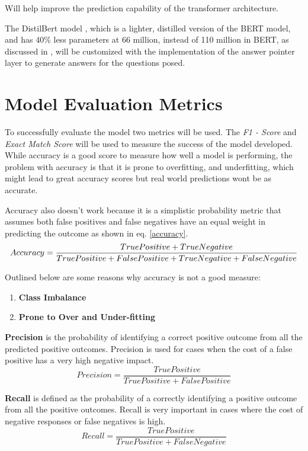 \documentclass[a4paper,12pt]{report}
\begin{document}
	Will help improve the prediction capability of the transformer architecture.

	The DistilBert model \citep{distil}, which is a lighter, distilled version of the BERT model, and has 40\% less parameters at 66 million, instead of 110 million in BERT, as discussed in \citep{bert}, will be customized with the implementation of the answer pointer layer to generate answers for the questions posed.


	\section{Model Evaluation Metrics}\label{33}

		To successfully evaluate the model two metrics will be used. The \textit{F1 - Score} and \textit{Exact Match Score} will be used to measure the success of the model developed. While accuracy is a good score to measure how well a model is performing, the problem with accuracy is that it is prone to overfitting, and underfitting, which might lead to great accuracy scores but real world predictions wont be as accurate.

		Accuracy also doesn't work because it is a simplistic probability metric that assumes both false positives and false negatives have an equal weight in predicting the outcome as shown in eq. \ref{accuracy}.
				\begin{equation}\label{accuracy}
			Accuracy = \small \dfrac{True Positive + True Negative}{True Positive + False Positive + True Negative + False Negative}
		\end{equation}

		Outlined below are some reasons why accuracy is not a good measure:
		\begin{enumerate}
			\item \textbf{Class Imbalance}
			\item \textbf{Prone to Over and Under-fitting}
		\end{enumerate}

	\textbf{Precision} is the probability of identifying a correct positive outcome from all the predicted positive outcomes. Precision is used for cases when the cost of a false positive has a very high negative impact.
	\begin{equation}\label{precision}
		Precision = \dfrac{True Positive}{True Positive +  False Positive }
	\end{equation}

	\textbf{Recall} is defined as the probability of a correctly identifying a positive outcome from all the positive outcomes. Recall is very important in cases where the cost of negative responses or false negatives is high.
		\begin{equation}\label{recall}
		Recall = \dfrac{True Positive}{True Positive +  False Negative }
	\end{equation}
\end{document}
